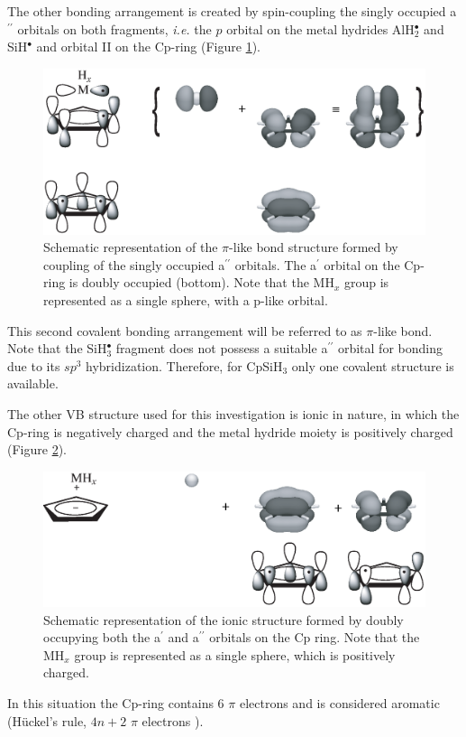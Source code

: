 The other bonding arrangement is created by spin-coupling the singly occupied a$^{\prime\prime}$ orbitals on both fragments, \textit{i.e.} the $p$ orbital on the metal hydrides AlH$_{2}^\bullet$ and SiH$^\bullet$ and orbital II on the Cp-ring (Figure \ref{ch4.fig.pi}).
\begin{figure}[htbp]
\center
\includegraphics[scale=0.45]{cyclopentadienyl/figures/pi.eps}
\caption{Schematic representation of the $\pi$-like bond structure formed by coupling of the singly occupied a$^{\prime\prime}$ orbitals. The a$^\prime$ orbital on the Cp-ring is doubly occupied (bottom). Note that the MH$_x$ group is represented as a single sphere, with a p-like orbital.}
\label{ch4.fig.pi}
\end{figure}
This second covalent bonding arrangement will be referred to as $\pi$-like bond. Note that the SiH$_{3}^\bullet$ fragment does not possess a suitable a$^{\prime\prime}$ orbital for bonding due to its $sp^3$ hybridization. Therefore, for CpSiH$_3$ only one covalent structure is available.

The other VB structure used for this investigation is ionic in nature, in which the Cp-ring is negatively charged and the metal hydride moiety is positively charged (Figure \ref{ch4.fig.ionic}).
\begin{figure}[htbp]
\center
\includegraphics[scale=0.45]{cyclopentadienyl/figures/ionic.eps}
\caption{Schematic representation of the ionic structure formed by doubly occupying both the a$^{\prime}$ and a$^{\prime\prime}$ orbitals on the Cp ring. Note that the MH$_x$ group is represented as a single sphere, which is positively charged.}
\label{ch4.fig.ionic}
\end{figure}
In this situation the Cp-ring contains 6 $\pi$ electrons and is considered aromatic (H\"{u}ckel's rule, $4n+2$ $\pi$ electrons \cite{streitwieser}).

